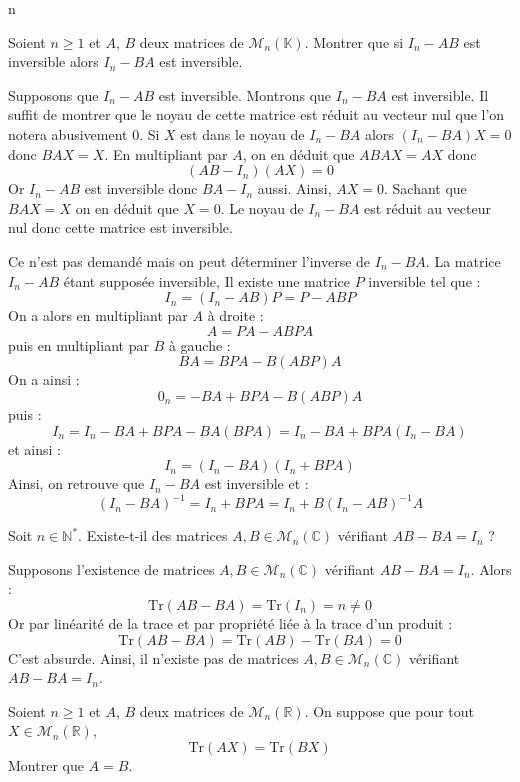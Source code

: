 n\documentclass[a4paper,10pt]{report}
\begin{document}
\begin{Exa} Soient $n\geq 1$ et $A$, $B$ deux matrices de $\mathcal{M}_n(\mathbb{K})$. Montrer que si $I_n - AB$ est inversible alors $I_n - BA$ est inversible.
\end{Exa} 

\corr Supposons que $I_n -AB$ est inversible. Montrons que $I_n-BA$ est inversible. Il suffit de montrer que le noyau de cette matrice est réduit au vecteur nul que l'on notera abusivement $0$. Si $X$ est dans le noyau de $I_n-BA$ alors $(I_n- BA)X=0$ donc $BAX=X$. En multipliant par $A$, on en déduit que $ABAX=AX$ donc 
$$ (AB-I_n)(AX)=0$$
Or $I_n -AB$ est inversible donc $BA-I_n$ aussi. Ainsi, $AX=0$. Sachant que $BAX=X$ on en déduit que $X=0$. Le noyau de $I_n-BA$ est réduit au vecteur nul donc cette matrice est inversible.

\medskip

\noindent Ce n'est pas demandé mais on peut déterminer l'inverse de $I_n-BA$. La matrice $I_n-AB$ étant supposée inversible, Il existe une matrice $P$ inversible tel que :
$$ I_n= (I_n-AB)P = P- ABP$$
On a alors en multipliant par $A$ à droite : 
$$ A = PA-ABPA$$
puis en multipliant par $B$ à gauche :
$$ BA = BPA- B(ABP)A$$
On a ainsi :
$$ 0_n = -BA + BPA- B(ABP)A$$
puis :
$$ I_n = I_n - BA +BPA - BA(BPA) = I_n - BA + BPA(I_n- BA)$$
et ainsi :
$$ I_n = (I_n-BA)(I_n+BPA)$$
Ainsi, on retrouve que $I_n-BA$ est inversible et :
$$ (I_n-BA)^{-1} = I_n+BPA = I_n+B(I_n-AB)^{-1}A$$


\begin{Exa} Soit $n \in \mathbb{N}^*$. Existe-t-il des matrices $A,B \in \mathcal{M}_n(\mathbb{C})$ vérifiant $AB - BA = I_n$ ?
\end{Exa}

\corr Supposons l'existence de matrices $A,B \in \mathcal{M}_n(\mathbb{C})$ vérifiant $AB - BA = I_n$. Alors :
$$ \textrm{Tr}(AB-BA) = \textrm{Tr}(I_n) = n \neq 0$$
Or par linéarité de la trace et par propriété liée à la trace d'un produit :
$$  \textrm{Tr}(AB-BA) =  \textrm{Tr}(AB)- \textrm{Tr}(BA) = 0$$
C'est absurde. Ainsi, il n'existe pas de matrices $A,B \in \mathcal{M}_n(\mathbb{C})$ vérifiant $AB - BA = I_n$.

\begin{Exa} Soient $n \geq 1$ et $A$, $B$ deux matrices de $\mathcal{M}_n(\mathbb{R})$. On suppose que pour tout $X \in \mathcal{M}_n(\mathbb{R})$, 
$$\textrm{Tr}(AX)= \textrm{Tr}(BX)$$
Montrer que $A=B$.
\end{Exa}
\end{document}
